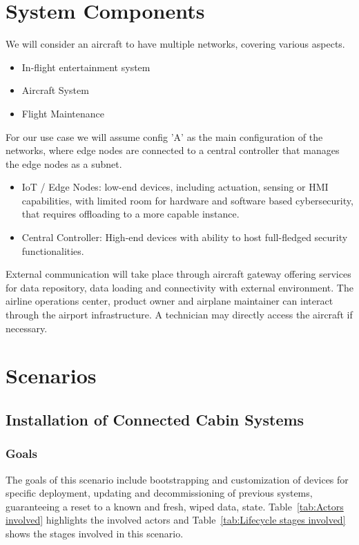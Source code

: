 \section{System Components}

We will consider an aircraft to have multiple networks, covering various aspects.
\begin{itemize}
	\item In-flight entertainment system
	\item Aircraft System
	\item Flight Maintenance
\end{itemize}

For our use case we will assume config 'A' as the main configuration of the networks, where edge nodes are connected to
a central controller that manages the edge nodes as a subnet.
\begin{itemize}
	\item IoT / Edge Nodes: low-end devices, including actuation, sensing or HMI capabilities, with limited
	      room for hardware and software based cybersecurity, that requires offloading to a more capable
	      instance.
	\item Central Controller: High-end devices with ability to host full-fledged security functionalities.
\end{itemize}

External communication will take place through aircraft gateway offering services for data repository, data loading and
connectivity with external environment. The airline operations center, product owner and airplane maintainer can interact
through the airport infrastructure. A technician may directly access the aircraft if necessary.


\section{Scenarios}
\subsection{Installation of Connected Cabin Systems} %
\label{sub:Installation of Connected Cabin Systems}

\subsubsection{Goals}

The goals of this scenario include bootstrapping and customization of devices for specific deployment, updating and
decommissioning of previous systems, guaranteeing a reset to a known and fresh, wiped data, state.
Table~\ref{tab:Actors involved} highlights the involved actors and Table~\ref{tab:Lifecycle stages involved} shows the
stages involved in this scenario.

